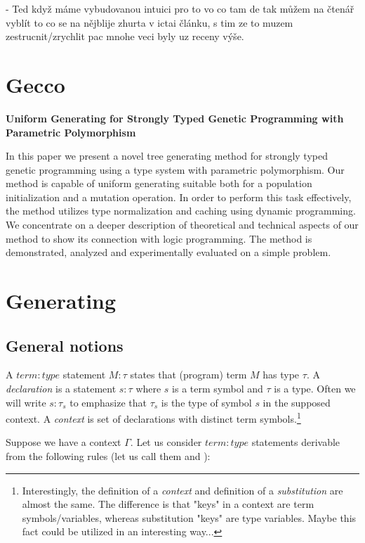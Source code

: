 \documentclass[a4paper,oneside]{memoir}
\begin{document}
- Ted když máme vybudovanou intuici pro to vo co tam de tak můžem na čtenář vyblít to co se na nějblije zhurta v ictai článku, s tim ze to muzem zestrucnit/zrychlit pac mnohe veci byly uz receny výše.




\chapter{Gecco}

\textbf{Uniform Generating for Strongly Typed Genetic Programming with Parametric Polymorphism}

In this paper we present a novel tree generating method for strongly typed genetic programming using a type system with parametric polymorphism. Our method is capable of uniform generating suitable both for a population initialization and a mutation operation. In order to perform this task effectively, the method utilizes type normalization and caching using dynamic programming. We concentrate on a deeper description of theoretical and technical aspects of our method to show its connection with logic programming. The method is demonstrated, analyzed and experimentally evaluated on a simple problem.


\chapter{Generating}

\section{General notions}

\begin{definition}
A $\mathit{term:type}$ statement $\mathit{M}:\mathit{\tau}$ states that (program) term $M$ has type $\tau$.   
A \textit{declaration} is a statement $s : \tau$ where $s$ is a term symbol and $\tau$ is a type.
Often we will write $s : \tau_s$ to emphasize that $\tau_s$ is the type of symbol $s$ in the supposed context.
A \textit{context} is set of declarations with distinct term symbols.\footnote{Interestingly, the definition of a \textit{context} and definition of a \textit{substitution} are almost the same. The difference is that "keys" in a context are term symbols/variables, whereas substitution "keys" are type variables. Maybe this fact could be utilized in an interesting way...}
\end{definition}


Suppose we have a context $\Gamma$. Let us consider $\mathit{term:type}$ statements derivable from the following rules (let us call them \subAx and \mguMp):
\end{document}
